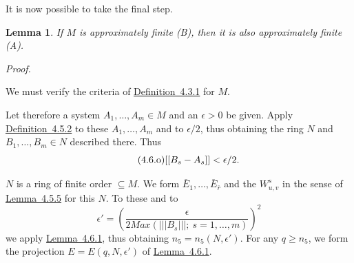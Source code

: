 \documentclass[b5paper,twoside]{article}
\newcommand{\lemref}[2]{\hyperref[#1]{\mbox{Lemma~#2}}}
\newcommand{\defref}[2]{\hyperref[#1]{\mbox{Definition~#2}}}
\theoremstyle{mvnplain}
\newtheorem{lemma}{Lemma}[section]
\renewenvironment{proof}[1][Proof]{%
  \par\addvspace{0.35\baselineskip}%
  \noindent\textit{#1.}\ \normalfont\ignorespaces
}{%
  \par\addvspace{0.35\baselineskip}%
}
\newcommand{\M}{\mathbf M}
\newcommand{\N}{\mathbf N}
\newcommand{\Metric}[1]{\left[\!\left[#1\right]\!\right]}
\newcommand{\OpNorm}[1]{\left\lvert\left\lvert\left\lvert#1\right\rvert\right\rvert\right\rvert}
\def\M{M}%
\def\N{N}%
\def\Metric#1{[[#1]]}%
\def\operatorname#1{#1}%
\begin{document}
It is now possible to take the final step.

\begin{lemma}\label{lem:4.6.2}
If \(\M\) is approximately finite (B), then it is also approximately finite (A).
\end{lemma}

\begin{proof}
We must verify the criteria of \defref{def:4.3.1}{4.3.1} for \(\M\).

Let therefore a system \(A_1,\ldots,A_m\in\M\) and an \(\epsilon>0\) be
given. Apply \defref{def:4.5.2}{4.5.2} to these \(A_1,\ldots,A_m\) and to
\(\epsilon/2\), thus obtaining the ring \(\N\) and
\(B_1,\ldots,B_m\in\N\) described there. Thus
\begin{equation}\tag{4.6.\(\mathrm{o}\)}\label{eq:4.6-omicron}
 \Metric{B_s-A_s}<\epsilon/2.
\end{equation}

\(\N\) is a ring of finite order \(\subseteq\M\). We form
\(\bar E_1,\ldots,\bar E_{\bar r}\) and the \(W^s_{u,v}\) in the sense of
\lemref{lem:4.5.5}{4.5.5} for this \(\N\). To these and to
\begin{equation}\tag{4.6.\(\pi\)}\label{eq:4.6-pi}
 \epsilon'=\left(\frac{\epsilon}{2\operatorname{Max}
 (\OpNorm{B_s};\ s=1,\ldots,m)}\right)^2
\end{equation}
we apply \lemref{lem:4.6.1}{4.6.1}, thus obtaining
\(n_5=n_5(\N,\epsilon')\). For any \(q\geq n_5\), we form the projection
\(E=E(q,\N,\epsilon')\) of \lemref{lem:4.6.1}{4.6.1}.


\end{proof}
\end{document}
